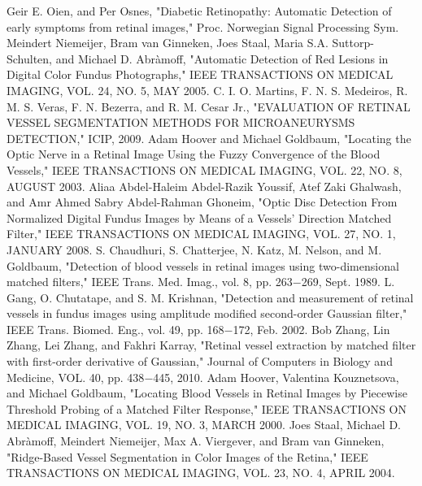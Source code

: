 \begin{thebibliography}{300}
 Geir E. Oien, and Per Osnes, "Diabetic Retinopathy: Automatic Detection of early symptoms from retinal images," Proc. Norwegian Signal Processing Sym. 
 Meindert Niemeijer, Bram van Ginneken, Joes Staal, Maria S.A. Suttorp-Schulten, and Michael D. Abràmoff, "Automatic Detection of Red Lesions in Digital Color Fundus Photographs," IEEE TRANSACTIONS ON MEDICAL IMAGING, VOL. 24, NO. 5, MAY 2005.
 C. I. O. Martins, F. N. S. Medeiros, R. M. S. Veras, F. N. Bezerra, and R. M. Cesar Jr., "EVALUATION OF RETINAL VESSEL SEGMENTATION METHODS FOR MICROANEURYSMS DETECTION," ICIP, 2009.
 Adam Hoover and Michael Goldbaum, "Locating the Optic Nerve in a Retinal Image Using the Fuzzy Convergence of the Blood Vessels," IEEE TRANSACTIONS ON MEDICAL IMAGING, VOL. 22, NO. 8, AUGUST 2003.
 Aliaa Abdel-Haleim Abdel-Razik Youssif, Atef Zaki Ghalwash, and Amr Ahmed Sabry Abdel-Rahman Ghoneim, "Optic Disc Detection From Normalized Digital Fundus Images by Means of a Vessels' Direction Matched Filter," IEEE TRANSACTIONS ON MEDICAL IMAGING, VOL. 27, NO. 1, JANUARY 2008.
 S. Chaudhuri, S. Chatterjee, N. Katz, M. Nelson, and M. Goldbaum, "Detection of blood vessels in retinal images using two-dimensional matched filters," IEEE Trans. Med. Imag., vol. 8, pp. 263$-$269, Sept. 1989.
 L. Gang, O. Chutatape, and S. M. Krishnan, "Detection and measurement of retinal vessels in fundus images using amplitude modified second-order Gaussian filter," IEEE Trans. Biomed. Eng., vol. 49, pp. 168$-$172, Feb. 2002.
 Bob Zhang, Lin Zhang, Lei Zhang, and Fakhri Karray, "Retinal vessel extraction by matched filter with first-order derivative of Gaussian," Journal of Computers in Biology and Medicine, VOL. 40, pp. 438$-$445, 2010.
 Adam Hoover, Valentina Kouznetsova, and Michael Goldbaum, "Locating Blood Vessels in Retinal Images by Piecewise Threshold Probing of a Matched Filter Response," IEEE TRANSACTIONS ON MEDICAL IMAGING, VOL. 19, NO. 3, MARCH 2000.
 Joes Staal, Michael D. Abràmoff, Meindert Niemeijer, Max A. Viergever, and Bram van Ginneken, "Ridge-Based Vessel Segmentation in Color Images of the Retina," IEEE TRANSACTIONS ON MEDICAL IMAGING, VOL. 23, NO. 4, APRIL 2004.

\end{thebibliography}
